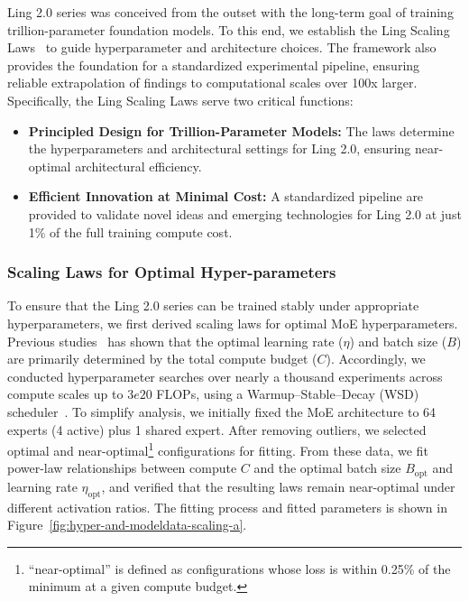 Ling 2.0 series was conceived from the outset with the long-term goal of training trillion-parameter foundation models. 
To this end, we establish the Ling Scaling Laws~\citep{tian2025greaterleveragescalinglaws} to guide hyperparameter and architecture choices. 
The framework also provides the foundation for a standardized experimental pipeline, ensuring reliable extrapolation of findings to computational scales over 100x larger.
Specifically, the Ling Scaling Laws serve two critical functions:
\begin{itemize}
\item 
\textbf{Principled Design for Trillion-Parameter Models:} 
The laws determine the hyperparameters and architectural settings for Ling 2.0, ensuring near-optimal architectural efficiency.
\item \textbf{Efficient Innovation at Minimal Cost:}
A standardized pipeline are provided to validate novel ideas and emerging technologies for Ling 2.0 at just 1\% of the full training compute cost. 
\end{itemize}

\subsubsection{Scaling Laws for Optimal Hyper-parameters}
\label{sec:scaling4parametres}
To ensure that the Ling 2.0 series can be trained stably under appropriate hyperparameters, we first derived scaling laws for optimal MoE hyperparameters. Previous studies~\citep{bi2024deepseek, team2025every} has shown that the optimal learning rate ($\eta$) and batch size ($B$) are primarily determined by the total compute budget ($C$). Accordingly, we conducted hyperparameter searches over nearly a thousand experiments across compute scales up to $3e{20}$ FLOPs, using a Warmup–Stable–Decay (WSD) scheduler~\citep{hu2024minicpm}.  
To simplify analysis, we initially fixed the MoE architecture to 64 experts (4 active) plus 1 shared expert. After removing outliers, we selected optimal and near-optimal\footnote{``near-optimal'' is defined as configurations whose loss is within 0.25\% of the minimum at a given compute budget.} configurations for fitting. From these data, we fit power-law relationships between compute $C$ and the optimal batch size $B_{\mathrm{opt}}$ and learning rate $\eta_{\mathrm{opt}}$, and verified that the resulting laws remain near-optimal under different activation ratios. The fitting process and fitted parameters is shown in Figure~\ref{fig:hyper-and-modeldata-scaling-a}.

